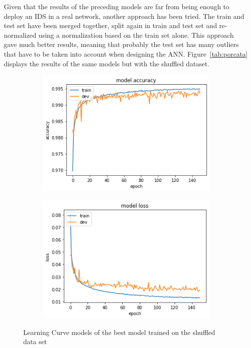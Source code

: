 Given that the results of the preceding models are far from being enough to deploy an IDS in a real network, another approach has been tried. The train and test set have been merged together, split again in train and test set and re-normalized using a normalization based on the train set alone. This approach gave much better results, meaning that probably the test set has many outliers that have to be taken into account when designing the ANN. Figure~\ref{tab:porcata} displays the results of the same models but with the shuffled dataset.

\begin{figure}[h]
\center
  \begin{subfigure}[b]{0.6\columnwidth}
    \includegraphics[width=\linewidth]{img/learn7.png}
  \end{subfigure}
  \hfill %
  \begin{subfigure}[b]{0.6\columnwidth}
 \includegraphics[width=\linewidth]{img/learn8.png}
  \end{subfigure}
\caption{Learning Curve models of the best model trained on the shuffled data set}
\end{figure}

